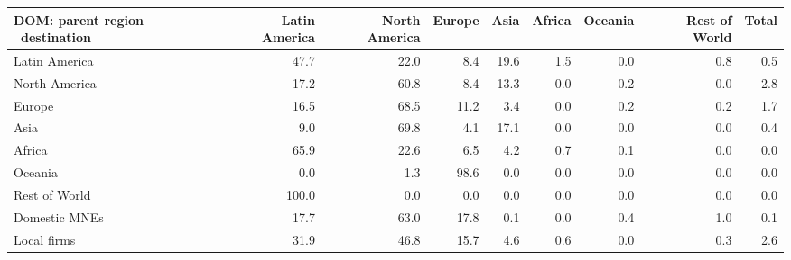\begin{tabular}{lrrrrrrrr}
\toprule
DOM: parent region \ destination & Latin America & North America & Europe & Asia & Africa & Oceania & Rest of World & Total \\
\midrule
Latin America & 47.7 & 22.0 & 8.4 & 19.6 & 1.5 & 0.0 & 0.8 & 0.5 \\
North America & 17.2 & 60.8 & 8.4 & 13.3 & 0.0 & 0.2 & 0.0 & 2.8 \\
Europe & 16.5 & 68.5 & 11.2 & 3.4 & 0.0 & 0.2 & 0.2 & 1.7 \\
Asia & 9.0 & 69.8 & 4.1 & 17.1 & 0.0 & 0.0 & 0.0 & 0.4 \\
Africa & 65.9 & 22.6 & 6.5 & 4.2 & 0.7 & 0.1 & 0.0 & 0.0 \\
Oceania & 0.0 & 1.3 & 98.6 & 0.0 & 0.0 & 0.0 & 0.0 & 0.0 \\
Rest of World & 100.0 & 0.0 & 0.0 & 0.0 & 0.0 & 0.0 & 0.0 & 0.0 \\
Domestic MNEs & 17.7 & 63.0 & 17.8 & 0.1 & 0.0 & 0.4 & 1.0 & 0.1 \\
Local firms & 31.9 & 46.8 & 15.7 & 4.6 & 0.6 & 0.0 & 0.3 & 2.6 \\
\bottomrule
\end{tabular}
